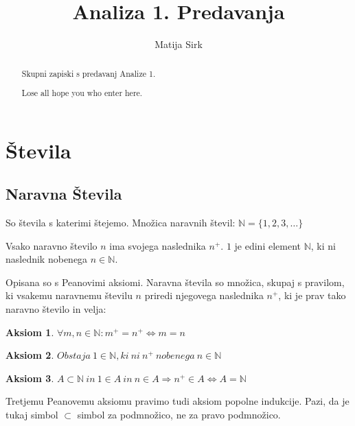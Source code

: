 \documentclass[a4paper]{article}
\title{Analiza 1. Predavanja}
\author{Matija Sirk}
\newtheorem{aksiom}{Aksiom}[section]
\newcommand{\nn}{\mathbb{N}} %
\begin{document}
\maketitle

\begin{abstract}
  Skupni zapiski s predavanj Analize 1.

  Lose all hope you who enter here.
\end{abstract}



\newpage
\tableofcontents
\newpage

\section{Števila}

\subsection{Naravna Števila}
So števila s katerimi štejemo.
Množica naravnih števil: $\nn = \{1, 2, 3, \dots\}$

Vsako naravno število $n$ ima svojega naslednika $n^+$.
$1$ je edini element $\nn$, ki ni naslednik nobenega $n \in \nn$.
 
Opisana so s Peanovimi aksiomi. Naravna števila so množica, skupaj s pravilom, ki vsakemu naravnemu številu $n$ priredi njegovega naslednika $n^+$, ki je prav tako naravno število in velja:

\begin{aksiom}
   $\forall m, n \in \nn :  m^+ = n^+ \Leftrightarrow m = n$
\end{aksiom}

\begin{aksiom}
  $Obstaja ~1 \in \nn, ki ~ni ~n^+ ~nobenega ~n \in \nn$
\end{aksiom}

\begin{aksiom}
  $A \subset \nn ~in ~1 \in A ~in ~n \in A \Rightarrow n^+ \in A \Leftrightarrow A = \nn$
\end{aksiom}

Tretjemu Peanovemu aksiomu pravimo tudi aksiom popolne indukcije.
Pazi, da je tukaj simbol $\subset$ simbol za podmnožico, ne za pravo podmnožico.
\end{document}
